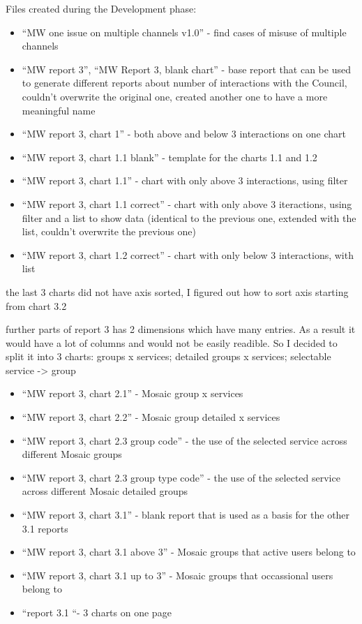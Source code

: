 Files created during the Development phase:
\begin{itemize}
\item “MW one issue on multiple channels v1.0” - find cases of misuse of multiple channels
\item “MW report 3”, “MW Report 3, blank chart” - base report that can be used to generate different reports about number of interactions with the Council, couldn't overwrite the original one, created another one to have a more meaningful name
\item “MW report 3, chart 1” - both above and below 3 interactions on one chart
\item “MW report 3, chart 1.1 blank” - template for the charts 1.1 and 1.2
\item “MW report 3, chart 1.1” - chart with only above 3 interactions, using filter
\item “MW report 3, chart 1.1 correct” - chart with only above 3 iteractions, using filter and a list to show data (identical to the previous one, extended with the list, couldn't overwrite the previous one)
\item “MW report 3, chart 1.2 correct” - chart with only below 3 interactions, with list
\end{itemize}

the last 3 charts did not have axis sorted, I figured out how to sort axis starting from chart 3.2
 
further parts of report 3 has 2 dimensions which have many entries. As a result it would have a lot of columns and would not be easily readible. So I decided to split it into 3 charts: groups x services; detailed groups x services; selectable service -> group

\begin{itemize}
\item “MW report 3, chart 2.1” - Mosaic group x services
\item “MW report 3, chart 2.2” - Mosaic group detailed x services
\item “MW report 3, chart 2.3 group code” - the use of the selected service across different Mosaic groups
\item “MW report 3, chart 2.3 group type code” - the use of the selected service across different Mosaic detailed groups
\item “MW report 3, chart 3.1” - blank report that is used as a basis for the other 3.1 reports
\item “MW report 3, chart 3.1 above 3” - Mosaic groups that active users belong to
\item “MW report 3, chart 3.1 up to 3” - Mosaic groups that occassional users belong to
\item “report 3.1 “- 3 charts on one page
\end{itemize}

